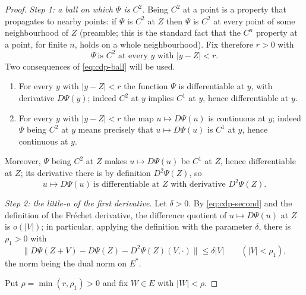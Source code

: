 \begin{proof}
\emph{Step 1: a ball on which $\Psi$ is $C^2$.}
Being $C^2$ at a point is a property that propagates to nearby points: if
$\Psi$ is $C^2$ at $Z$ then $\Psi$ is $C^2$ at every point of some neighbourhood
of $Z$ (preamble; this is the standard fact that the $C^n$ property at a point,
for finite $n$, holds on a whole neighbourhood). Fix therefore $r>0$ with
\begin{equation}\label{eq:cdp-ball}
  \Psi\ \text{is }C^2\text{ at every }y\text{ with }|y-Z|<r .
\end{equation}
Two consequences of \eqref{eq:cdp-ball} will be used.
\begin{enumerate}
\item[(1a)] For every $y$ with $|y-Z|<r$ the function $\Psi$ is differentiable
  at $y$, with derivative $D\Psi(y)$; indeed $C^2$ at $y$ implies $C^1$ at $y$,
  hence differentiable at $y$.
\item[(1b)] For every $y$ with $|y-Z|<r$ the map $u\mapsto D\Psi(u)$ is
  continuous at $y$; indeed $\Psi$ being $C^2$ at $y$ means precisely that
  $u\mapsto D\Psi(u)$ is $C^1$ at $y$, hence continuous at $y$.
\end{enumerate}
Moreover, $\Psi$ being $C^2$ at $Z$ makes $u\mapsto D\Psi(u)$ be $C^1$ at $Z$,
hence differentiable at $Z$; its derivative there is by definition
$D^2\Psi(Z)$, so
\begin{equation}\label{eq:cdp-second}
  u\mapsto D\Psi(u)\ \text{is differentiable at }Z\text{ with derivative }
  D^2\Psi(Z).
\end{equation}

\emph{Step 2: the little-o of the first derivative.}
Let $\delta>0$. By \eqref{eq:cdp-second} and the definition of the Fr\'echet
derivative, the difference quotient of $u\mapsto D\Psi(u)$ at $Z$ is $o(|V|)$;
in particular, applying the definition with the parameter $\delta$, there is
$\rho_1>0$ with
\begin{equation}\label{eq:cdp-littleo}
  \bigl\|D\Psi(Z+V)-D\Psi(Z)-D^2\Psi(Z)(V,\cdot)\bigr\|\le\delta|V|
  \qquad(|V|<\rho_1),
\end{equation}
the norm being the dual norm on $E^\ast$.

Put $\rho=\min(r,\rho_1)>0$ and fix $W\in E$ with $|W|<\rho$.


\end{proof}
